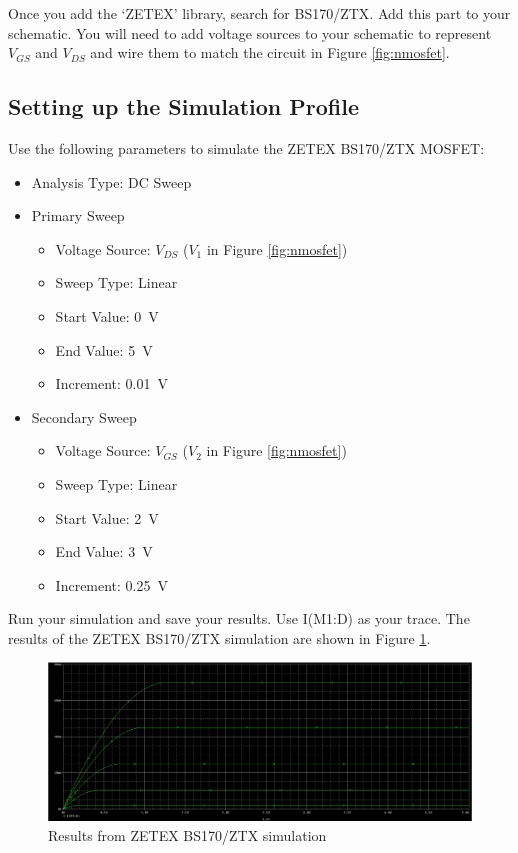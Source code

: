 \documentclass[12pt]{../manual}
\begin{document}
Once you add the `ZETEX’ library, search for BS170/ZTX. Add this part to your schematic. You will need to add voltage sources to your schematic to represent $V_{GS}$ and $V_{DS}$ and wire them to match the circuit in Figure \ref{fig:nmosfet}.

\newpage
\subsection{Setting up the Simulation Profile}
\label{sim}
Use the following parameters to simulate the ZETEX BS170/ZTX MOSFET:
\begin{itemize}
\item Analysis Type: DC Sweep
\item Primary Sweep
\begin{itemize}
\item Voltage Source: $V_{DS}$ ($V_1$ in Figure \ref{fig:nmosfet}) 
\item Sweep Type: Linear
\item Start Value: \SI{0}{\volt}
\item End Value: \SI{5}{\volt}
\item Increment: \SI{0.01}{\volt} 
\end{itemize}
\item Secondary Sweep
\begin{itemize}
\item Voltage Source: $V_{GS}$ ($V_2$ in Figure \ref{fig:nmosfet}) 
\item Sweep Type: Linear
\item Start Value: \SI{2}{\volt}
\item End Value: \SI{3}{\volt}
\item Increment: \SI{0.25}{\volt}
\end{itemize}
\end{itemize}


Run your simulation and save your results. Use I(M1:D) as your trace. The results of the ZETEX BS170/ZTX simulation are shown in Figure \ref{fig:zetexsim}.

\begin{figure}[ht!]
\begin{center}
\includegraphics[width=\textwidth]{figures/simulationBase}
\end{center}
\caption{Results from ZETEX BS170/ZTX simulation}
\label{fig:zetexsim}
\end{figure}
\end{document}
